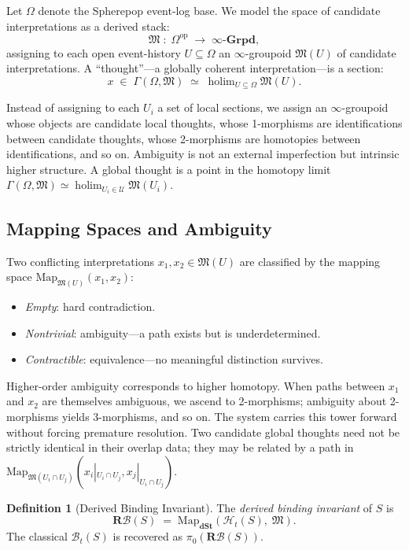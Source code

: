 \documentclass[11pt, letterpaper]{article}
\theoremstyle{plain}
\theoremstyle{definition}
\newtheorem{definition}[theorem]{Definition}
\theoremstyle{remark}
\newcommand{\BI}{\mathcal{B}}
\newcommand{\HH}{\mathcal{H}}
\newcommand{\MM}{\mathfrak{M}}
\newcommand{\op}{\mathrm{op}}
\newcommand{\Map}{\mathrm{Map}}
\newcommand{\holim}{\operatorname{holim}}
\newcommand{\Grp}{\infty\text{-}\mathbf{Grpd}}
\newcommand{\dSt}{\mathbf{dSt}}
\begin{document}
Let $\Omega$ denote the Spherepop event-log base. We model the space of candidate
interpretations as a derived stack:
\[
  \MM \;:\; \Omega^{\op} \;\longrightarrow\; \Grp,
\]
assigning to each open event-history $U \subseteq \Omega$ an $\infty$-groupoid
$\MM(U)$ of candidate interpretations. A ``thought''---a globally coherent
interpretation---is a section:
\[
  x \;\in\; \Gamma(\Omega, \MM) \;\simeq\; \holim_{U \subseteq \Omega} \MM(U).
\]

Instead of assigning to each $U_i$ a set of local sections, we assign an
$\infty$-groupoid whose objects are candidate local thoughts, whose 1-morphisms are
identifications between candidate thoughts, whose 2-morphisms are homotopies between
identifications, and so on. Ambiguity is not an external imperfection but intrinsic
higher structure. A global thought is a point in the homotopy limit
$\Gamma(\Omega, \MM) \simeq \holim_{U_i \in \mathcal{U}} \MM(U_i)$.

\subsection{Mapping Spaces and Ambiguity}

Two conflicting interpretations $x_1, x_2 \in \MM(U)$ are classified by the mapping
space $\Map_{\MM(U)}(x_1, x_2)$:
\begin{itemize}[noitemsep]
  \item \emph{Empty}: hard contradiction.
  \item \emph{Nontrivial}: ambiguity---a path exists but is underdetermined.
  \item \emph{Contractible}: equivalence---no meaningful distinction survives.
\end{itemize}

Higher-order ambiguity corresponds to higher homotopy. When paths between $x_1$ and
$x_2$ are themselves ambiguous, we ascend to 2-morphisms; ambiguity about 2-morphisms
yields 3-morphisms, and so on. The system carries this tower forward without forcing
premature resolution. Two candidate global thoughts need not be strictly identical in
their overlap data; they may be related by a path in
$\Map_{\MM(U_i \cap U_j)}(x_i|_{U_i \cap U_j}, x_j|_{U_i \cap U_j})$.

\begin{definition}[Derived Binding Invariant]
The \emph{derived binding invariant} of $S$ is
\[
  \mathbf{R}\BI(S) \;=\; \Map_{\dSt}(\HH_t(S),\;\MM).
\]
The classical $\BI_t(S)$ is recovered as $\pi_0(\mathbf{R}\BI(S))$.
\end{definition}
\end{document}
